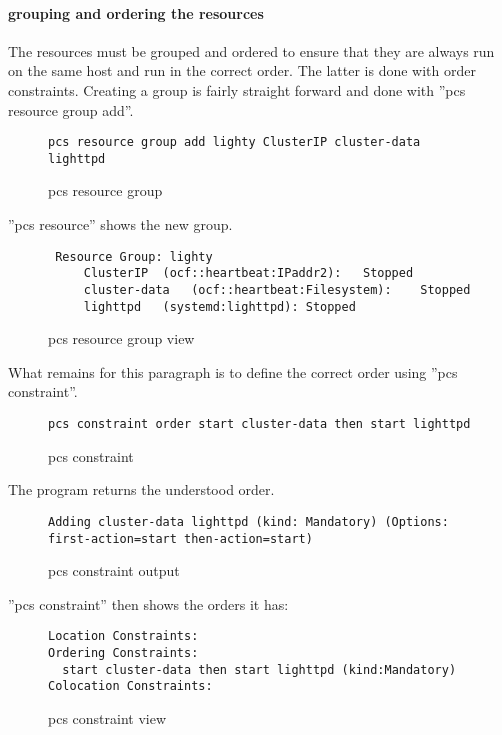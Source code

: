\paragraph{grouping and ordering the resources}
The resources must be grouped and ordered to ensure that they are always
run on the same host and run in the correct order. The latter is done with order
constraints.
Creating a group is fairly straight forward and done with ''pcs resource group add''.
\begin{figure}
\begin{lstlisting}
pcs resource group add lighty ClusterIP cluster-data lighttpd
\end{lstlisting}
\caption{pcs resource group}
\end{figure}
''pcs resource'' shows the new group.
\begin{figure}
\begin{lstlisting}
 Resource Group: lighty
     ClusterIP	(ocf::heartbeat:IPaddr2):	Stopped 
     cluster-data	(ocf::heartbeat:Filesystem):	Stopped 
     lighttpd	(systemd:lighttpd):	Stopped 
\end{lstlisting}
\caption{pcs resource group view}
\end{figure}
What remains for this paragraph is to define the correct order using ''pcs constraint''.
\begin{figure}
\begin{lstlisting}
pcs constraint order start cluster-data then start lighttpd
\end{lstlisting}
\caption{pcs constraint}
\end{figure}
The program returns the understood order.
\begin{figure}
\begin{lstlisting}
Adding cluster-data lighttpd (kind: Mandatory) (Options: first-action=start then-action=start)
\end{lstlisting}
\caption{pcs constraint output}
\end{figure}
''pcs constraint'' then shows the orders it has:
\begin{figure}
\begin{lstlisting}
Location Constraints:
Ordering Constraints:
  start cluster-data then start lighttpd (kind:Mandatory)
Colocation Constraints:
\end{lstlisting}
\caption{pcs constraint view}
\end{figure}
